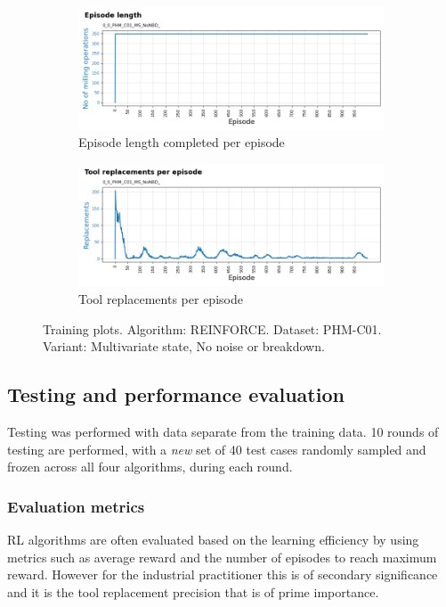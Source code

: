 \documentclass[a4paper, 12pt]{article}
\begin{document}
\begin{figure}[ht]
	\begin{subfigure}[b]{0.5\textwidth}
		\centering
		\includegraphics[width=\textwidth]{images/TrainingPlots/0_0_PHM_C01_MS_NoNBD__Episode_Length.png}  
		\caption{Episode length completed per episode}
		\label{fig:C01eplen}
	\end{subfigure}
	\hfill
	\begin{subfigure}[b]{0.5\textwidth}
		\centering
		\includegraphics[width=\textwidth]{images/TrainingPlots/0_0_PHM_C01_MS_NoNBD__Tool_Replacements.png}  
		\caption{Tool replacements per episode}
		\label{fig:C01toolrep}
	\end{subfigure} 
	\caption{Training plots. Algorithm: REINFORCE. Dataset: PHM-C01. Variant: Multivariate state, No noise or breakdown.}
	\label{fig:C01trplots}
\end{figure}

\subsection{Testing and performance evaluation}
Testing was performed with data separate from the training data. 10 rounds of testing are performed, with a \textit{new} set of 40 test cases randomly sampled and frozen across all four algorithms, during each round.

\subsubsection*{Evaluation metrics}
RL algorithms are often evaluated based on the learning efficiency by using metrics such as average reward and the number of episodes to reach maximum reward. However for the industrial practitioner this is of secondary significance and it is the tool replacement precision that is of prime importance. 
\end{document}
